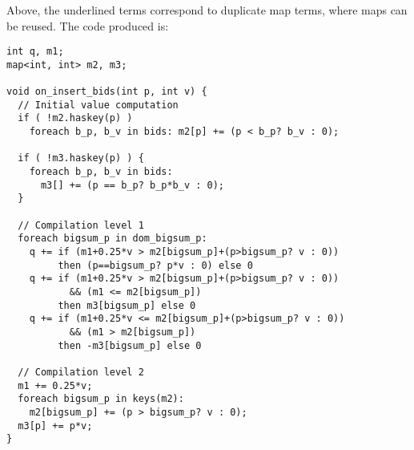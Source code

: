 Above, the underlined terms correspond to duplicate map terms, where maps can be
reused. The code produced is:

\begin{verbatim}
int q, m1;
map<int, int> m2, m3;

void on_insert_bids(int p, int v) {
  // Initial value computation
  if ( !m2.haskey(p) )
    foreach b_p, b_v in bids: m2[p] += (p < b_p? b_v : 0);

  if ( !m3.haskey(p) ) {
    foreach b_p, b_v in bids:
      m3[] += (p == b_p? b_p*b_v : 0);
  }

  // Compilation level 1
  foreach bigsum_p in dom_bigsum_p:
    q += if (m1+0.25*v > m2[bigsum_p]+(p>bigsum_p? v : 0))
         then (p==bigsum_p? p*v : 0) else 0
    q += if (m1+0.25*v > m2[bigsum_p]+(p>bigsum_p? v : 0))
           && (m1 <= m2[bigsum_p])
         then m3[bigsum_p] else 0
    q += if (m1+0.25*v <= m2[bigsum_p]+(p>bigsum_p? v : 0))
           && (m1 > m2[bigsum_p])
         then -m3[bigsum_p] else 0

  // Compilation level 2
  m1 += 0.25*v;
  foreach bigsum_p in keys(m2):
    m2[bigsum_p] += (p > bigsum_p? v : 0);
  m3[p] += p*v;
}
\end{verbatim}

